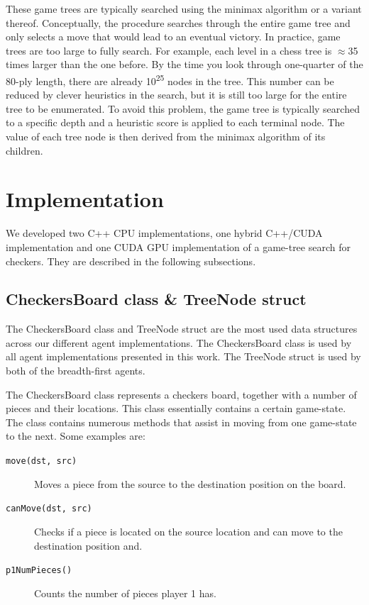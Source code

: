 \documentclass[11pt]{article}
\begin{document}
These game trees are typically searched using the minimax algorithm or a
variant thereof. Conceptually, the procedure searches through the entire
game tree and only selects a move that would lead to an eventual victory. In
practice, game trees are too large to fully search. For
example, each level in a chess tree is $\approx$35 times larger than the one
before. By the time you look through one-quarter of the 80-ply length, there
are already 10\textsuperscript{25} nodes in the tree. This number can be
reduced by clever heuristics in the search, but it is still too large for the
entire tree to be enumerated.
To avoid this problem, the game tree is typically searched to a specific depth and
a heuristic score is applied to each terminal node. The value of each tree node
is then derived from the minimax algorithm of its children.

\newpage
\section{Implementation}

We developed two C++ CPU implementations, one hybrid C++/CUDA implementation and
one CUDA GPU implementation of a game-tree search for checkers. They are
described in the following subsections.

\subsection{CheckersBoard class \& TreeNode struct}


The CheckersBoard class and TreeNode struct are the most used data structures
across our different agent implementations. The CheckersBoard class is used by
all agent implementations presented in this work. The TreeNode struct is used by
both of the breadth-first agents.

The CheckersBoard class represents a checkers board, together with a number of
pieces and their locations. This class essentially contains a certain
game-state. The class contains numerous methods that assist in moving from one
game-state to the next. Some examples are: %
\begin{description}
    \item[\texttt{move(dst, src)}] Moves a piece from the source to the
    destination position on the board.
\item[\texttt{canMove(dst, src)}] Checks if a piece is located on the
    source location and can move to the destination position and.
\item[\texttt{p1NumPieces()}] Counts the number of pieces player 1 has.
\end{description}
\end{document}
